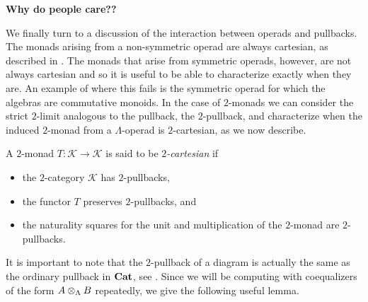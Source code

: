\textbf{Why do people care??}

We finally turn to a discussion of the interaction between operads and pullbacks. The monads arising from a non-symmetric operad are always cartesian, as described in \cite{leinster}. The monads that arise from symmetric operads, however, are not always cartesian and so it is useful to be able to characterize exactly when they are. An example of where this fails is the symmetric operad for which the algebras are commutative monoids. In the case of $2$-monads we can consider the  strict $2$-limit analogous to the pullback, the $2$-pullback, and characterize when the induced $2$-monad from a $\Lambda$-operad is $2$-cartesian, as we now describe.

\begin{Defi}
A $2$-monad $T \colon \mathcal{K} \rightarrow \mathcal{K}$ is said to be \textit{$2$-cartesian} if
    \begin{itemize}
        \item the $2$-category $\mathcal{K}$ has $2$-pullbacks,
        \item the functor $T$ preserves $2$-pullbacks, and
        \item the naturality squares for the unit and multiplication of the $2$-monad are $2$-pullbacks.
    \end{itemize}
\end{Defi}

It is important to note that the  $2$-pullback of a diagram is actually the same as the ordinary pullback in $\mathbf{Cat}$, see \cite{kelly-elem}. Since we will be computing with coequalizers of the form $A \otimes_\Lambda B$ repeatedly, we give the following useful lemma.

